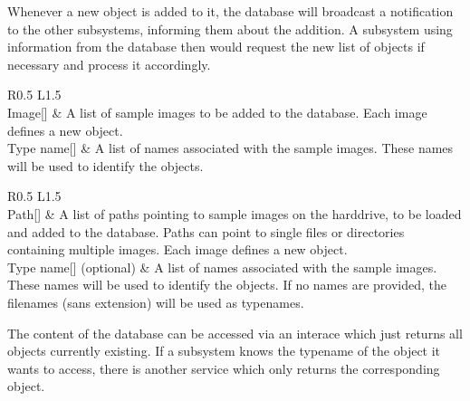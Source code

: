 Whenever a new object is added to it, the database will broadcast a notification to the other subsystems, informing them about the addition. A subsystem using information from the database then would request the new list of objects if necessary and process it accordingly. \\

\begin{table}[H]
  \centering
  \caption[Database add-images interface.]{Images can be provided through this interface to add new objects to the database.}
  \label{tab:db-add-images}
  \renewcommand{\arraystretch}{1.5}
  \begin{tabularx}{\textwidth}{R{0.5} L{1.5}}
    \hline
     \\
    \hline
    Image[]     & A list of sample images to be added to the database. Each image defines a new object. \\
    Type name[] & A list of names associated with the sample images. These names will be used to identify the objects. \\
    \hline
  \end{tabularx}
\end{table}

\begin{table}[H]
  \centering
  \caption[Database add-files interface.]{Paths to image files can be provided through this interface to add new objects to the database.}
  \label{tab:db-add-files}
  \renewcommand{\arraystretch}{1.5}
  \begin{tabularx}{\textwidth}{R{0.5} L{1.5}}
    \hline
     \\
    \hline
    Path[]                 & A list of paths pointing to sample images on the harddrive, to be loaded and added to the database. Paths can point to single files or directories containing multiple images. Each image defines a new object. \\
    Type name[] (optional) & A list of names associated with the sample images. These names will be used to identify the objects. If no names are provided, the filenames (sans extension) will be used as typenames. \\
    \hline
  \end{tabularx}
\end{table}

The content of the database can be accessed via an interace which just returns all objects currently existing. If a subsystem knows the typename of the object it wants to access, there is another service which only returns the corresponding object. \\

